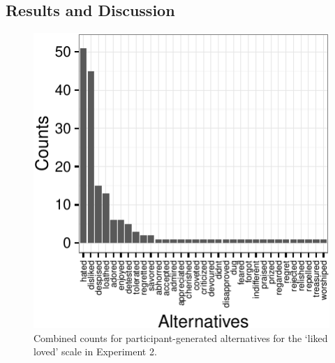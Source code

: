 \documentclass[10pt, letterpaper]{article}
\newenvironment{CodeChunk}{}{}
\begin{document}
\subsection{Results and Discussion}\label{results-and-discussion-1}

\begin{CodeChunk}
\begin{figure}[t]

{\centering \includegraphics{figs/exp2_altsPlot_likedLoved-1} 

}

\caption[Combined counts for participant-generated alternatives for the `liked  loved' scale in Experiment 2]{Combined counts for participant-generated alternatives for the `liked  loved' scale in Experiment 2.}\label{fig:exp2_altsPlot_likedLoved}
\end{figure}
\end{CodeChunk}
\end{document}
